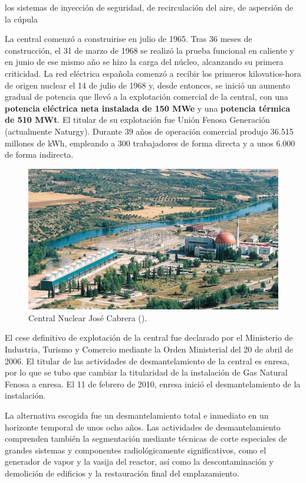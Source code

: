 los sistemas de inyección de seguridad, de recirculación del aire, de aspersión de la cúpula

La central comenzó a construirise en julio de 1965. Tras 36 meses de construcción, el 31 de marzo de 1968 se realizó la prueba funcional en caliente y en junio de ese mismo año se hizo la carga del núcleo, alcanzando su primera criticidad. La red eléctrica española comenzó a recibir los primeros kilovatios-hora de origen nuclear el 14 de julio de 1968 y, desde entonces, se inició un aumento gradual de potencia que llevó a la explotación comercial de la central, con una \textbf{potencia eléctrica neta instalada de 150 MWe} y una \textbf{potencia térmica de 510 MWt}. El titular de su explotación fue Unión Fenosa Generación (actualmente Naturgy). Durante 39 años de operación comercial produjo 36.515 millones de kWh, empleando a 300 trabajadores de forma directa y a unos 6.000 de forma indirecta.

\begin{figure}[h]
    \centering
    \includegraphics[width=\textwidth]{content/figures/zorita.jpg}
    \caption{Central Nuclear José Cabrera (\cite{sne_recursos_prensa}).}
    \label{fig:zorita}
\end{figure}

El cese definitivo de explotación de la central fue declarado por el Ministerio de Industria, Turismo y Comercio mediante la Orden Ministerial del 20 de abril de 2006. El titular de las actividades de desmantelamiento de la central es \acrshort{enresa}, por lo que se tubo que cambiar la titularidad de la instalación de Gas Natural Fenosa a \acrshort{enresa}. El 11 de febrero de 2010, \acrshort{enresa} inició el desmantelamiento de la instalación.

La alternativa escogida fue un desmantelamiento total e inmediato en un horizonte temporal de unos ocho años. Las actividades de desmantelamiento comprenden también la segmentación mediante técnicas de corte especiales de grandes sistemas y componentes radiológicamente significativos, como el generador de vapor y la vasija del reactor, así como la descontaminación y demolición de edificios y la restauración final del emplazamiento. 

